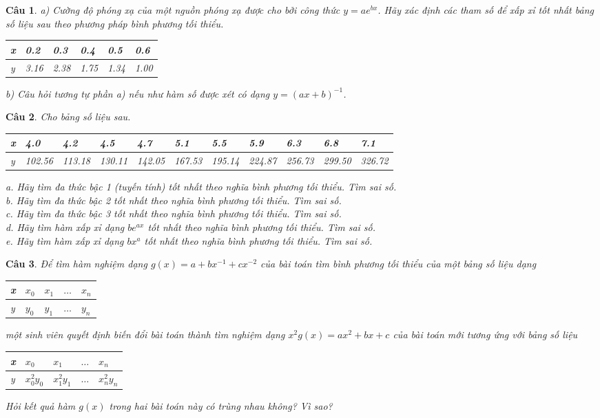 \documentclass[11pt]{article}
\newtheorem{bt}{Câu}
\begin{document}
\begin{bt} a) Cường độ phóng xạ của một nguồn phóng xạ được cho bởi công thức $y=ae^{bx}$. Hãy xác định các tham số để xấp xỉ tốt nhất bảng số liệu sau theo phương pháp bình phương tối thiểu.
%
\begin{center}
	\begin{tabular}[5]{l|l|l|l|l|l}
		x & 0.2    & 0.3    & 0.4    & 0.5    & 0.6  \\ \hline
		y & 3.16   & 2.38   & 1.75   & 1.34   & 1.00
	\end{tabular}	
\end{center}
%
b) Câu hỏi tương tự phần a) nếu như hàm số được xét có dạng $y=(ax+b)^{-1}$.
\end{bt}

\begin{bt} Cho bảng số liệu sau.
%
\begin{center}
	\begin{tabular}[10]{l|l|l|l|l|l|l|l|l|l|l}
	x & 4.0 & 4.2 & 4.5 & 4.7 & 5.1 & 5.5 & 5.9 & 6.3 & 6.8 & 7.1 \\ \hline
    y & 102.56 & 113.18 &130.11 & 142.05 & 167.53 & 195.14 & 224.87 & 256.73 & 299.50 & 326.72
 	\end{tabular}	
\end{center}
%
a. Hãy tìm đa thức bậc 1 (tuyến tính) tốt nhất theo nghĩa bình phương tối thiểu. Tìm sai số. \\
b. Hãy tìm đa thức bậc 2 tốt nhất theo nghĩa bình phương tối thiểu. Tìm sai số. \\
c. Hãy tìm đa thức bậc 3 tốt nhất theo nghĩa bình phương tối thiểu. Tìm sai số. \\
d. Hãy tìm hàm xấp xỉ dạng $be^{ax}$ tốt nhất theo nghĩa bình phương tối thiểu. Tìm sai số. \\
e. Hãy tìm hàm xấp xỉ dạng $bx^{a}$ tốt nhất theo nghĩa bình phương tối thiểu. Tìm sai số. 
\end{bt}

\begin{bt} Để tìm hàm nghiệm dạng $g(x)=a + bx^{-1} + cx^{-2}$ của bài toán tìm bình phương tối thiểu của một bảng số liệu dạng
%
\begin{center}
	\begin{tabular}[5]{l|l|l|l|l}
		x & $x_0$ & $x_1$ & $\dots$ & $x_n$  \\ \hline
		y & $y_0$ & $y_1$ & $\dots$ & $y_n$
	\end{tabular}	
\end{center}
%
một sinh viên quyết định biến đổi bài toán thành tìm nghiệm dạng $x^2 g(x) = ax^2 + bx + c$	của bài toán mới tương ứng với bảng số liệu
%
\begin{center}
	\begin{tabular}[5]{l|l|l|l|l}
	x & $x_0$ & $x_1$ & $\dots$ & $x_n$  \\[.2pt] \hline
	y & $x_{0}^2y_0$ & $x_{1}^2 y _1$ & $\dots$ & $x_{n}^2 y _n$
	\end{tabular}	
\end{center}
%
Hỏi kết quả hàm $g(x)$ trong hai bài toán này có trùng nhau không? Vì sao?
\end{bt}
\end{document}
